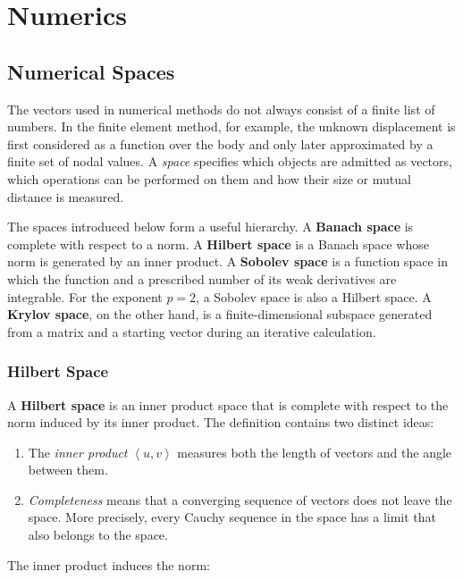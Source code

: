 \newpage
\chapter{Numerics}

\section{Numerical Spaces}

The vectors used in numerical methods do not always consist of a finite list of
numbers. In the finite element method, for example, the unknown displacement is
first considered as a function over the body and only later approximated by a
finite set of nodal values. A \textit{space} specifies which objects are admitted
as vectors, which operations can be performed on them and how their size or
mutual distance is measured.

The spaces introduced below form a useful hierarchy. A \textbf{Banach space} is
complete with respect to a norm. A \textbf{Hilbert space} is a Banach space whose
norm is generated by an inner product. A \textbf{Sobolev space} is a function
space in which the function and a prescribed number of its weak derivatives are
integrable. For the exponent $ p=2 $, a Sobolev space is also a Hilbert space.
A \textbf{Krylov space}, on the other hand, is a finite-dimensional subspace
generated from a matrix and a starting vector during an iterative calculation.

\subsection{Hilbert Space}

A \textbf{Hilbert space} is an inner product space that is complete with respect
to the norm induced by its inner product. The definition contains two distinct
ideas:

\begin{enumerate}
    \item The \textit{inner product} $ \left< u,v \right> $ measures both the
        length of vectors and the angle between them.

    \item \textit{Completeness} means that a converging sequence of vectors does
        not leave the space. More precisely, every Cauchy sequence in the space
        has a limit that also belongs to the space.
\end{enumerate}

The inner product induces the norm:

